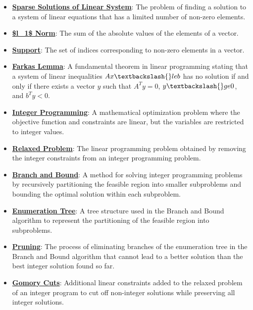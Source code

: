 \documentclass{article}%
\begin{document}
\begin{itemize}[leftmargin=*]
\item \href{https://www.math.purdue.edu/~yipn/421/2024-10-28-ApplsLinProg.pdf#page=30}{\textbf{Sparse Solutions of Linear System}}: The problem of finding a solution to a system of linear equations that has a limited number of non-zero elements.%
\item \href{https://www.math.purdue.edu/~yipn/421/2024-10-28-ApplsLinProg.pdf#page=34}{\textbf{\$l\_1\$ Norm}}: The sum of the absolute values of the elements of a vector.%
\item \href{https://www.math.purdue.edu/~yipn/421/2024-10-28-ApplsLinProg.pdf#page=30}{\textbf{Support}}: The set of indices corresponding to non-zero elements in a vector.%
\end{itemize}%
\begin{itemize}[leftmargin=*]%
\item \href{https://www.math.purdue.edu/~yipn/421/2024-10-28-Farkas.pdf#page=1}{\textbf{Farkas Lemma}}: A fundamental theorem in linear programming stating that a system of linear inequalities $Ax \textbackslash{}le b$ has no solution if and only if there exists a vector $y$ such that $A^T y = 0$, $y \textbackslash{}ge 0$, and $b^T y < 0$.%
\end{itemize}%
\begin{itemize}[leftmargin=*]%
\item \href{https://www.math.purdue.edu/~yipn/421/2024-10-31-IntLinProg.pdf#page=1}{\textbf{Integer Programming}}: A mathematical optimization problem where the objective function and constraints are linear, but the variables are restricted to integer values.%
\item \href{https://www.math.purdue.edu/~yipn/421/2024-10-31-IntLinProg.pdf#page=2}{\textbf{Relaxed Problem}}: The linear programming problem obtained by removing the integer constraints from an integer programming problem.%
\item \href{https://www.math.purdue.edu/~yipn/421/2024-10-31-IntLinProg.pdf#page=5}{\textbf{Branch and Bound}}: A method for solving integer programming problems by recursively partitioning the feasible region into smaller subproblems and bounding the optimal solution within each subproblem.%
\item \href{https://www.math.purdue.edu/~yipn/421/2024-10-31-IntLinProg.pdf#page=6}{\textbf{Enumeration Tree}}: A tree structure used in the Branch and Bound algorithm to represent the partitioning of the feasible region into subproblems.%
\item \href{https://www.math.purdue.edu/~yipn/421/2024-10-31-IntLinProg.pdf#page=11}{\textbf{Pruning}}: The process of eliminating branches of the enumeration tree in the Branch and Bound algorithm that cannot lead to a better solution than the best integer solution found so far.%
\item \href{https://www.math.purdue.edu/~yipn/421/2024-10-31-IntLinProg.pdf#page=15}{\textbf{Gomory Cuts}}: Additional linear constraints added to the relaxed problem of an integer program to cut off non-integer solutions while preserving all integer solutions.%
\end{itemize}%
\end{document}
